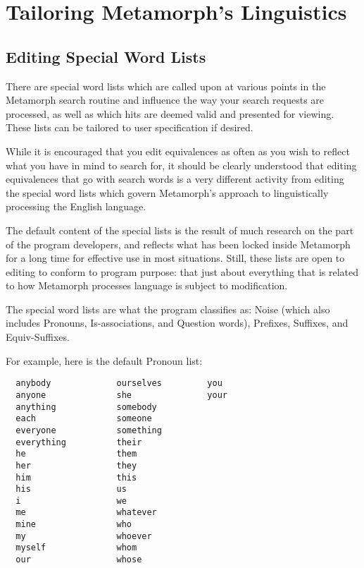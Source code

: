 \chapter{Tailoring Metamorph's Linguistics}{\label{chp:mmling}}

\section{Editing Special Word Lists}

There are special word lists which are called upon at various points
in the Metamorph search routine and influence the way your search
requests are processed, as well as which hits are deemed valid and
presented for viewing.  These lists can be tailored to user
specification if desired.

While it is encouraged that you edit equivalences as often as you wish
to reflect what you have in mind to search for, it should be clearly
understood that editing equivalences that go with search words is a
very different activity from editing the special word lists which
govern Metamorph's approach to linguistically processing the English
language.

The default content of the special lists is the result of much
research on the part of the program developers, and reflects what has
been locked inside Metamorph for a long time for effective use in most
situations.  Still, these lists are open to editing to conform to
program purpose:  that just about everything that is related to how
Metamorph processes language is subject to modification.

The special word lists are what the program classifies as:  Noise
(which also includes Pronouns, Is-associations, and Question words),
Prefixes, Suffixes, and Equiv-Suffixes.

For example, here is the default Pronoun list:

\begin{verbatim}
  anybody             ourselves         you
  anyone              she               your
  anything            somebody
  each                someone
  everyone            something
  everything          their
  he                  them
  her                 they
  him                 this
  his                 us
  i                   we
  me                  whatever
  mine                who
  my                  whoever
  myself              whom
  our                 whose
\end{verbatim}

